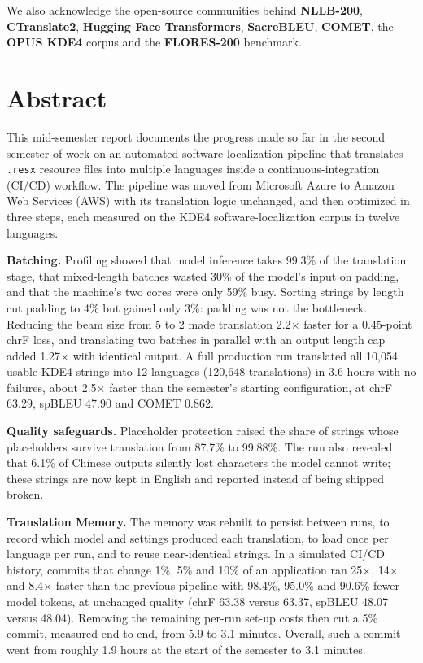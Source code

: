 \documentclass[11pt,a4paper]{article}
\newcommand{\code}[1]{\texttt{#1}}
\newcommand{\x}{$\times$}
\begin{document}
We also acknowledge the open-source communities behind \textbf{NLLB-200}, \textbf{CTranslate2}, \textbf{Hugging Face
Transformers}, \textbf{SacreBLEU}, \textbf{COMET}, the \textbf{OPUS KDE4} corpus and the \textbf{FLORES-200} benchmark.
\clearpage

\section*{Abstract}
This mid-semester report documents the progress made so far in the second semester of work on an automated
software-localization pipeline that translates
\code{.resx} resource files into multiple languages inside a continuous-integration (CI/CD) workflow. The pipeline was
moved from Microsoft Azure to Amazon Web Services (AWS) with its translation logic unchanged, and then optimized in three
steps, each measured on the KDE4 software-localization corpus in twelve languages.

\textbf{Batching.} Profiling showed that model inference takes 99.3\% of the translation stage, that mixed-length batches
wasted 30\% of the model's input on padding, and that the machine's two cores were only 59\% busy. Sorting strings by
length cut padding to 4\% but gained only 3\%: padding was not the bottleneck. Reducing the beam size from 5 to 2 made
translation 2.2\x{} faster for a 0.45-point chrF loss, and translating two batches in parallel with an output length cap
added 1.27\x{} with identical output. A full production run translated all 10,054 usable KDE4 strings into 12 languages
(120,648 translations) in 3.6 hours with no failures, about 2.5\x{} faster than the semester's starting configuration, at chrF 63.29, spBLEU 47.90 and
COMET 0.862.

\textbf{Quality safeguards.} Placeholder protection raised the share of strings whose placeholders survive translation
from 87.7\% to 99.88\%. The run also revealed that 6.1\% of Chinese outputs silently lost characters the model cannot
write; these strings are now kept in English and reported instead of being shipped broken.

\textbf{Translation Memory.} The memory was rebuilt to persist between runs, to record which model and settings produced
each translation, to load once per language per run, and to reuse near-identical strings. In a simulated CI/CD history,
commits that change 1\%, 5\% and 10\% of an application ran 25\x{}, 14\x{} and 8.4\x{} faster than the previous
pipeline with 98.4\%, 95.0\% and 90.6\% fewer model tokens, at unchanged quality (chrF 63.38 versus 63.37, spBLEU
48.07 versus 48.04). Removing the
remaining per-run set-up costs then cut a 5\% commit, measured end to end, from 5.9 to 3.1 minutes. Overall, such a
commit went from roughly 1.9 hours at the start of the semester to 3.1 minutes.
\clearpage
\end{document}
